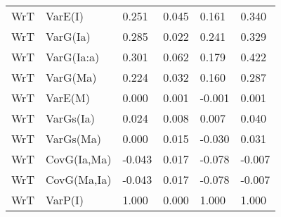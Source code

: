 \begin{center}
\begin{longtable}{|p{0.6in}|p{0.7in}|p{0.6in}|p{0.6in}|p{0.6in}|p{0.6in}|}
  WrT & VarE(I) & 0.251 & 0.045 & 0.161 & 0.340 \\ 
  WrT & VarG(Ia) & 0.285 & 0.022 & 0.241 & 0.329 \\ 
  WrT & VarG(Ia:a) & 0.301 & 0.062 & 0.179 & 0.422  \\
  WrT & VarG(Ma) & 0.224 & 0.032 & 0.160 & 0.287  \\
  WrT & VarE(M)  & 0.000 & 0.001 & -0.001 & 0.001 \\
  WrT & VarGs(Ia) & 0.024 & 0.008 & 0.007 & 0.040 \\
  WrT & VarGs(Ma) & 0.000 & 0.015 & -0.030 & 0.031 \\
  WrT & CovG(Ia,Ma) & -0.043 & 0.017 & -0.078 & -0.007 \\
  WrT & CovG(Ma,Ia) & -0.043 & 0.017 & -0.078 & -0.007 \\
  WrT & VarP(I) & 1.000 & 0.000 & 1.000 & 1.000 \\ 
   \hline
\end{longtable}
\end{center}
%
